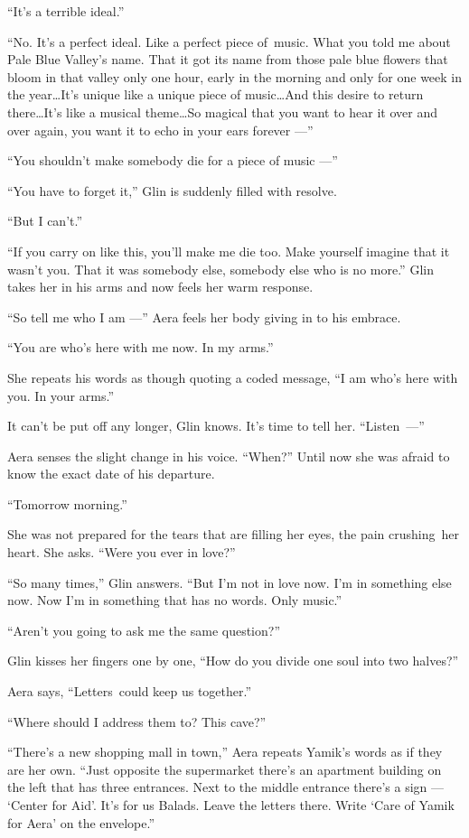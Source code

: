 \documentclass[twoside,11pt,openany]{book}
\begin{document}
``It's a terrible ideal.''

``No. It's a perfect ideal. Like a perfect piece of~music. What you told me about Pale Blue Valley's name.
That it got its name from those pale blue flowers that bloom in that valley only one hour, early in the morning and
only for one week in the year{\ldots}It's unique like a unique piece of
music{\ldots}And this desire to return there{\ldots}It's
like a musical theme{\ldots}So magical that you want to hear it over and over again, you want it to echo in your
ears forever ---''

``You shouldn't make somebody die for a piece of music ---''

``You have to forget it,'' Glin is suddenly filled with resolve.

``But I can't.''

``If you carry on like this, you'll make me die too.
Make{ }yourself{ }imagine that it wasn't you. That it was somebody else, somebody else
who is no more.'' Glin takes her in his arms and now feels her warm response.

``So tell me who I am ---'' Aera feels her body giving in to his embrace.

``You are who's here with me now. In my arms.''

She repeats his words as though quoting a coded message, ``I am who's here with you. In your
arms.''

It can't be put off any longer, Glin knows. It's time to tell her.
\hbox{``Listen ---''}

Aera senses the slight change in his voice. ``When?'' Until now she was afraid to know the
exact date of his departure.

``Tomorrow morning.''

She was not prepared for the tears that are filling her eyes, the pain crushing~her heart. She asks. ``Were
you ever in love?''

``So many times,'' Glin answers. ``But I'm not in love now. I'm in something else
now. Now I'm in something that has no words. Only music.''

``Aren't you going to ask me the same question?''

Glin kisses her fingers one by one, ``How do you divide one soul into two halves?''

Aera says, ``Letters~could keep us together.''

``Where should I address them to? This cave?''

``There's a new shopping mall in town,'' Aera repeats Yamik's words as if they are her own.
``Just opposite the supermarket there's an apartment building on the left that has three entrances. Next
to the middle entrance there's a sign --- `Center for Aid'. It's for us Balads. Leave the letters there. Write `Care of
Yamik for Aera' on the envelope.''
\end{document}

